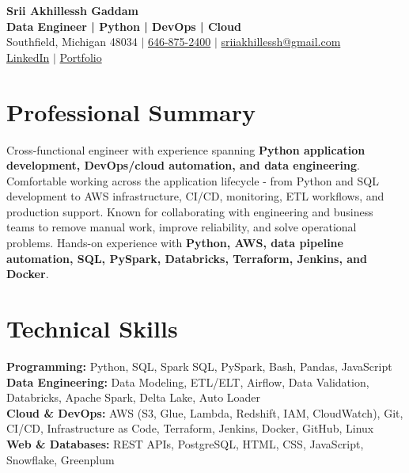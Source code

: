 \documentclass[letterpaper,10pt]{article}
\begin{document}
\fontsize{9.35pt}{10.45pt}\selectfont

\begin{center}
    {\LARGE \textbf{Srii Akhillessh Gaddam}} \\[-1pt]
    \textbf{Data Engineer | Python | DevOps | Cloud} \\[2pt]
    Southfield, Michigan 48034 $|$
    \href{tel:6468752400}{646-875-2400} $|$
    \href{mailto:sriiakhillessh@gmail.com}{sriiakhillessh@gmail.com} \\[1pt]
    \href{https://www.linkedin.com/in/srii-akhiilessh-gaddam-b48668191/}{LinkedIn} $|$
    \href{https://sriiakhillesshg.github.io/portfolio/}{Portfolio}
\end{center}
\vspace{-8pt}

\section{Professional Summary}
\small{Cross-functional engineer with experience spanning \textbf{Python application development, DevOps/cloud automation, and data engineering}. Comfortable working across the application lifecycle - from Python and SQL development to AWS infrastructure, CI/CD, monitoring, ETL workflows, and production support. Known for collaborating with engineering and business teams to remove manual work, improve reliability, and solve operational problems. Hands-on experience with \textbf{Python, AWS, data pipeline automation, SQL, PySpark, Databricks, Terraform, Jenkins, and Docker}.}

\section{Technical Skills}
\small{
\textbf{Programming:} Python, SQL, Spark SQL, PySpark, Bash, Pandas, JavaScript \\
\textbf{Data Engineering:} Data Modeling, ETL/ELT, Airflow, Data Validation, Databricks, Apache Spark, Delta Lake, Auto Loader \\
\textbf{Cloud \& DevOps:} AWS (S3, Glue, Lambda, Redshift, IAM, CloudWatch), Git, CI/CD, Infrastructure as Code, Terraform, Jenkins, Docker, GitHub, Linux \\
\textbf{Web \& Databases:} REST APIs, PostgreSQL, HTML, CSS, JavaScript, Snowflake, Greenplum
}
\end{document}
